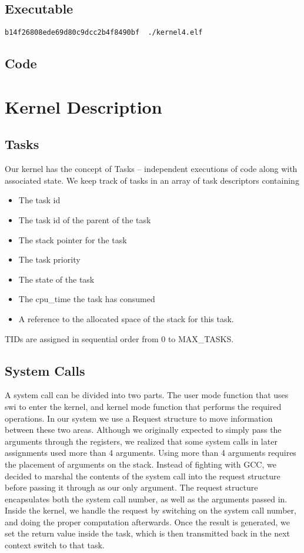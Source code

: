 \documentclass{article}
\begin{document}
\subsection{Executable}
\begin{verbatim}
b14f26808ede69d80c9dcc2b4f8490bf  ./kernel4.elf
\end{verbatim}

\subsection{Code}

\section{Kernel Description}

\subsection{Tasks}

Our kernel has the concept of Tasks -- independent executions of code along with associated state. We keep track of tasks in an array of task descriptors containing

\begin{itemize}
  \item The task id
  \item The task id of the parent of the task
  \item The stack pointer for the task
  \item The task priority
  \item The state of the task
  \item The cpu\_time the task has consumed
  \item A reference to the allocated space of the stack for this task.
\end{itemize}

TIDs are assigned in sequential order from 0 to MAX\_TASKS.

\subsection{System Calls}

A system call can be divided into two parts. The user mode function that uses swi to enter the kernel, and kernel mode function that performs the required operations. In our system we use a Request structure to move information between these two areas. Although we originally expected to simply pass the arguments through the registers, we realized that some system calls in later assignments used more than 4 arguments. Using more than 4 arguments requires the placement of arguments on the stack. Instead of fighting with GCC, we decided to marshal the contents of the system call into the request structure before passing it through as our only argument. The request structure encapsulates both the system call number, as well as the arguments passed in. Inside the kernel, we handle the request by switching on the system call number, and doing the proper computation afterwards. Once the result is generated, we set the return value inside the task, which is then transmitted back in the next context switch to that task.
\end{document}
